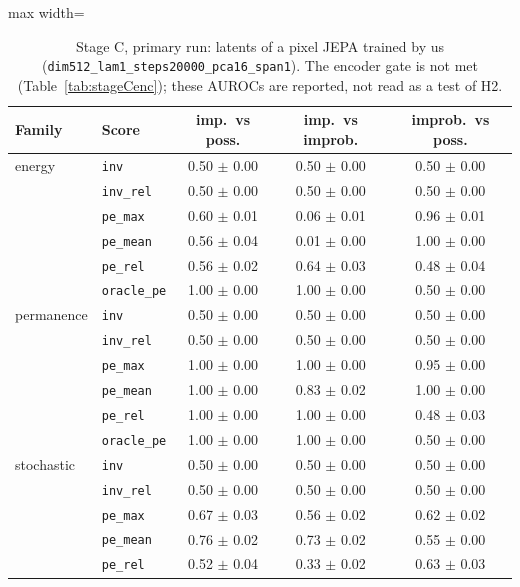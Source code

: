 \begin{table}[t]\centering\small
\caption{Stage C, primary run: latents of a pixel JEPA trained by us (\texttt{dim512\_lam1\_steps20000\_pca16\_span1}). The encoder gate is not met (Table~\ref{tab:stageCenc}); these AUROCs are reported, not read as a test of H2.}\label{tab:stageC0}
\begin{adjustbox}{max width=\linewidth}\begin{tabular}{llccc}\toprule
Family & Score & imp.\ vs poss. & imp.\ vs improb. & improb.\ vs poss.\\\midrule
energy & \texttt{inv} & 0.50 $\pm$ 0.00 & 0.50 $\pm$ 0.00 & 0.50 $\pm$ 0.00\\
 & \texttt{inv\_rel} & 0.50 $\pm$ 0.00 & 0.50 $\pm$ 0.00 & 0.50 $\pm$ 0.00\\
 & \texttt{pe\_max} & 0.60 $\pm$ 0.01 & 0.06 $\pm$ 0.01 & 0.96 $\pm$ 0.01\\
 & \texttt{pe\_mean} & 0.56 $\pm$ 0.04 & 0.01 $\pm$ 0.00 & 1.00 $\pm$ 0.00\\
 & \texttt{pe\_rel} & 0.56 $\pm$ 0.02 & 0.64 $\pm$ 0.03 & 0.48 $\pm$ 0.04\\
 & \texttt{oracle\_pe} & 1.00 $\pm$ 0.00 & 1.00 $\pm$ 0.00 & 0.50 $\pm$ 0.00\\
\midrule
permanence & \texttt{inv} & 0.50 $\pm$ 0.00 & 0.50 $\pm$ 0.00 & 0.50 $\pm$ 0.00\\
 & \texttt{inv\_rel} & 0.50 $\pm$ 0.00 & 0.50 $\pm$ 0.00 & 0.50 $\pm$ 0.00\\
 & \texttt{pe\_max} & 1.00 $\pm$ 0.00 & 1.00 $\pm$ 0.00 & 0.95 $\pm$ 0.00\\
 & \texttt{pe\_mean} & 1.00 $\pm$ 0.00 & 0.83 $\pm$ 0.02 & 1.00 $\pm$ 0.00\\
 & \texttt{pe\_rel} & 1.00 $\pm$ 0.00 & 1.00 $\pm$ 0.00 & 0.48 $\pm$ 0.03\\
 & \texttt{oracle\_pe} & 1.00 $\pm$ 0.00 & 1.00 $\pm$ 0.00 & 0.50 $\pm$ 0.00\\
\midrule
stochastic & \texttt{inv} & 0.50 $\pm$ 0.00 & 0.50 $\pm$ 0.00 & 0.50 $\pm$ 0.00\\
 & \texttt{inv\_rel} & 0.50 $\pm$ 0.00 & 0.50 $\pm$ 0.00 & 0.50 $\pm$ 0.00\\
 & \texttt{pe\_max} & 0.67 $\pm$ 0.03 & 0.56 $\pm$ 0.02 & 0.62 $\pm$ 0.02\\
 & \texttt{pe\_mean} & 0.76 $\pm$ 0.02 & 0.73 $\pm$ 0.02 & 0.55 $\pm$ 0.00\\
 & \texttt{pe\_rel} & 0.52 $\pm$ 0.04 & 0.33 $\pm$ 0.02 & 0.63 $\pm$ 0.03\\

\end{tabular}
\end{adjustbox}
\end{table}
